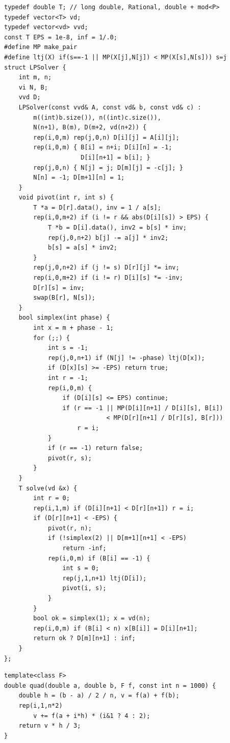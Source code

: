 \begin{lstlisting}
typedef double T; // long double, Rational, double + mod<P>
typedef vector<T> vd;
typedef vector<vd> vvd;
const T EPS = 1e-8, inf = 1/.0;
#define MP make_pair
#define ltj(X) if(s==-1 || MP(X[j],N[j]) < MP(X[s],N[s])) s=j
struct LPSolver {
    int m, n;
    vi N, B;
    vvd D;
    LPSolver(const vvd& A, const vd& b, const vd& c) :
        m((int)b.size()), n((int)c.size()),
        N(n+1), B(m), D(m+2, vd(n+2)) {
        rep(i,0,m) rep(j,0,n) D[i][j] = A[i][j];
        rep(i,0,m) { B[i] = n+i; D[i][n] = -1;
                     D[i][n+1] = b[i]; }
        rep(j,0,n) { N[j] = j; D[m][j] = -c[j]; }
        N[n] = -1; D[m+1][n] = 1;
    }
    void pivot(int r, int s) {
        T *a = D[r].data(), inv = 1 / a[s];
        rep(i,0,m+2) if (i != r && abs(D[i][s]) > EPS) {
            T *b = D[i].data(), inv2 = b[s] * inv;
            rep(j,0,n+2) b[j] -= a[j] * inv2;
            b[s] = a[s] * inv2;
        }
        rep(j,0,n+2) if (j != s) D[r][j] *= inv;
        rep(i,0,m+2) if (i != r) D[i][s] *= -inv;
        D[r][s] = inv;
        swap(B[r], N[s]);
    }
    bool simplex(int phase) {
        int x = m + phase - 1;
        for (;;) {
            int s = -1;
            rep(j,0,n+1) if (N[j] != -phase) ltj(D[x]);
            if (D[x][s] >= -EPS) return true;
            int r = -1;
            rep(i,0,m) {
                if (D[i][s] <= EPS) continue;
                if (r == -1 || MP(D[i][n+1] / D[i][s], B[i])
                            < MP(D[r][n+1] / D[r][s], B[r]))
                    r = i;
            }
            if (r == -1) return false;
            pivot(r, s);
        }
    }
    T solve(vd &x) {
        int r = 0;
        rep(i,1,m) if (D[i][n+1] < D[r][n+1]) r = i;
        if (D[r][n+1] < -EPS) {
            pivot(r, n);
            if (!simplex(2) || D[m+1][n+1] < -EPS)
                return -inf;
            rep(i,0,m) if (B[i] == -1) {
                int s = 0;
                rep(j,1,n+1) ltj(D[i]);
                pivot(i, s);
            }
        }
        bool ok = simplex(1); x = vd(n);
        rep(i,0,m) if (B[i] < n) x[B[i]] = D[i][n+1];
        return ok ? D[m][n+1] : inf;
    }
};
\end{lstlisting}


\begin{lstlisting}
template<class F>
double quad(double a, double b, F f, const int n = 1000) {
    double h = (b - a) / 2 / n, v = f(a) + f(b);
    rep(i,1,n*2)
        v += f(a + i*h) * (i&1 ? 4 : 2);
    return v * h / 3;
}
\end{lstlisting}
